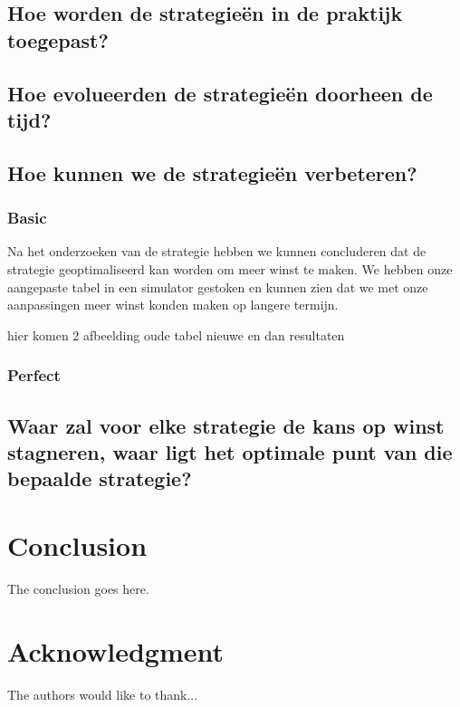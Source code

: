 \documentclass[conference]{IEEEtran}
\begin{document}
\subsection{Hoe worden de strategieën in de praktijk toegepast?}

\subsection{Hoe evolueerden de strategieën doorheen de tijd?}

\subsection{Hoe kunnen we de strategieën verbeteren?}
\subsubsection{Basic}
Na het onderzoeken van de strategie hebben we kunnen concluderen dat de strategie geoptimaliseerd kan worden om meer winst te maken.
We hebben onze aangepaste tabel in een simulator gestoken en kunnen zien dat we met onze aanpassingen meer winst konden maken op langere termijn.

hier komen 2 afbeelding oude tabel nieuwe en dan resultaten
\subsubsection{Perfect}

\subsection{ Waar zal voor elke strategie de kans op winst stagneren, waar ligt het optimale punt van die bepaalde strategie?}

\section{Conclusion}
The conclusion goes here.

\section*{Acknowledgment}

The authors would like to thank...

\end{document}
